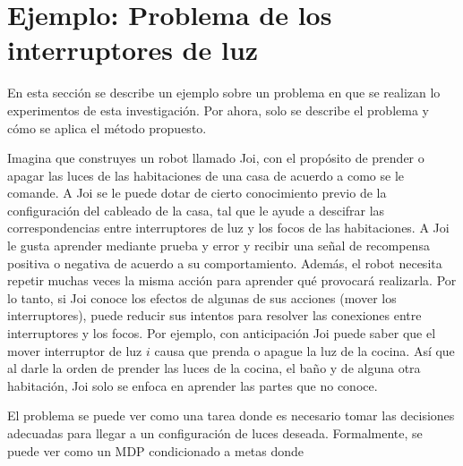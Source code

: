 \section{Ejemplo: Problema de los interruptores de luz}\label{section:switches-example}

En esta sección se describe un ejemplo sobre un problema en que se realizan 
lo experimentos de esta investigación. Por ahora, solo se describe el problema
y cómo se aplica el método propuesto.

Imagina que construyes un robot llamado Joi, con el propósito de prender o apagar las luces de las habitaciones 
de una casa de acuerdo a como se le comande.
A Joi se le puede dotar de cierto conocimiento previo de la configuración
del cableado de la casa, tal que le ayude a descifrar las correspondencias entre
interruptores de luz y los focos de las habitaciones. 
 A Joi le gusta aprender mediante prueba
 y error y recibir una señal de recompensa positiva o negativa de acuerdo a su comportamiento. Además, el robot 
 necesita repetir muchas veces la misma acción para aprender
 qué provocará realizarla. Por lo tanto, si Joi conoce los efectos de algunas de sus acciones (mover los interruptores), puede reducir sus intentos para
 resolver las conexiones entre interruptores y los focos. 
 Por ejemplo, con anticipación Joi puede saber que el mover interruptor de luz $i$ causa que
prenda o apague la luz de la cocina.
 Así que al darle la orden de prender las luces de la cocina, el baño y de alguna otra habitación, Joi solo se enfoca en aprender las partes que no
 conoce.
 
 El problema se puede ver como una tarea donde es necesario tomar las
 decisiones adecuadas para llegar a un configuración de luces deseada. Formalmente, se puede ver como un MDP condicionado a metas donde 
 
